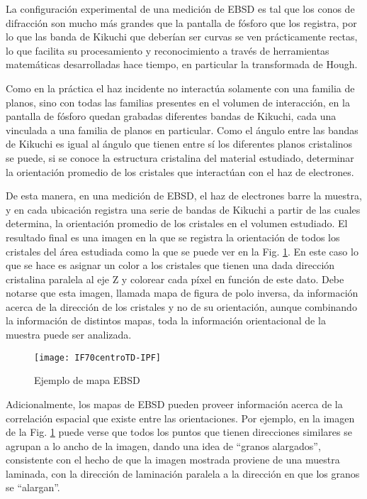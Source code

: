 La configuración experimental de una medición de EBSD es tal que los conos de difracción son mucho más grandes que la pantalla de fósforo que los registra, por lo que las banda de Kikuchi que deberían ser curvas se ven prácticamente rectas, lo que facilita su procesamiento y reconocimiento a través de herramientas matemáticas desarrolladas hace tiempo, en particular la transformada de Hough\cite{wiki:Hough}.

Como en la práctica el haz incidente no interactúa solamente con una familia de planos, sino con todas las familias presentes en el volumen de interacción, en la pantalla de fósforo quedan grabadas diferentes bandas de Kikuchi, cada una vinculada a una familia de planos en particular.
Como el ángulo entre las bandas de Kikuchi es igual al ángulo que tienen entre sí los diferentes planos cristalinos\cite{schwartz2010electron} se puede, si se conoce la estructura cristalina del material estudiado, determinar la orientación promedio de los cristales que interactúan con el haz de electrones.

De esta manera, en una medición de EBSD, el haz de electrones barre la muestra, y en cada ubicación registra una serie de bandas de Kikuchi a partir de las cuales determina, la orientación promedio de los cristales en el volumen estudiado.
El resultado final es una imagen en la que se registra la orientación de todos los cristales del área estudiada como la que se puede ver en la Fig. \ref{fig:ebsdex}. 
En este caso lo que se hace es asignar un color a los cristales que tienen una dada dirección cristalina paralela al eje Z y colorear cada píxel en función de este dato. 
Debe notarse que esta imagen, llamada mapa de figura de polo inversa, da información acerca de la dirección de los cristales y no de su orientación, aunque combinando la información de distintos mapas, toda la información orientacional de la muestra puede ser analizada.
\begin{figure}[!htb]
  \centering
  \texttt{[image: IF70centroTD-IPF]}
  \caption{Ejemplo de mapa EBSD}
  \label{fig:ebsdex}
\end{figure}

Adicionalmente, los mapas de EBSD pueden proveer información acerca de la correlación espacial que existe entre las orientaciones. 
Por ejemplo, en la imagen de la Fig. \ref{fig:ebsdex} puede verse que todos los puntos que tienen direcciones similares se agrupan a lo ancho de la imagen, dando una idea de ``granos alargados'', consistente con el hecho de que la imagen mostrada proviene de una muestra laminada, con la dirección de laminación paralela a la dirección en que los granos se ``alargan''.

